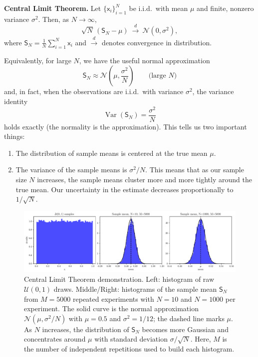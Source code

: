 \begin{definitionBox}
    \textbf{Central Limit Theorem.}
    Let $\{\mathsf{x}_i\}_{i=1}^N$ be i.i.d.\ with mean $\mu$ and finite, nonzero variance $\sigma^2$. Then, as $N\to\infty$,
    \begin{equation}
        \sqrt{N}\,(\mathsf{S}_N-\mu)\ \xrightarrow{d}\ \mathcal{N}(0,\sigma^2),
    \end{equation}
    where $\mathsf{S}_N=\frac{1}{N}\sum_{i=1}^N \mathsf{x}_i$ and $\xrightarrow{d}$ denotes convergence in distribution.
\end{definitionBox}
Equivalently, for large $N$, we have the useful normal approximation
\begin{equation}
    \mathsf{S}_N \approx \mathcal{N}\!\left(\mu,\frac{\sigma^2}{N}\right)  \qquad\text{(large $N$)}
\end{equation}
and, in fact, when the observations are i.i.d.\ with variance $\sigma^2$, the variance identity
\begin{equation}
    \operatorname{Var}(\mathsf{S}_N)=\frac{\sigma^2}{N}
\end{equation}
holds exactly (the normality is the approximation). This tells us two important things:
\begin{enumerate}
    \item The distribution of sample means is centered at the true mean $\mu$.
    \item The variance of the sample means is $\sigma^2/N$. This means that as our sample size $N$ increases, the sample means cluster more and more tightly around the true mean. Our uncertainty in the estimate decreases proportionally to $1/\sqrt{N}$.
\end{enumerate}

\begin{figure}[h!]
    \centering
    \includegraphics[width=\textwidth]{figs/probability/clt.pdf}
    \caption{Central Limit Theorem demonstration. Left: histogram of raw \(\mathcal{U}(0,1)\) draws. Middle/Right: histograms of the sample mean \(\mathsf{S}_N\) from \(M=5000\) repeated experiments with \(N=10\) and \(N=1000\) per experiment. The solid curve is the normal approximation \(\mathcal{N}(\mu,\sigma^2/N)\) with \(\mu=0.5\) and \(\sigma^2=1/12\); the dashed line marks \(\mu\). As \(N\) increases, the distribution of \(\mathsf{S}_N\) becomes more Gaussian and concentrates around \(\mu\) with standard deviation \(\sigma/\sqrt{N}\). Here, \(M\) is the number of independent repetitions used to build each histogram.}
    \label{fig:clt-demo}
\end{figure}

